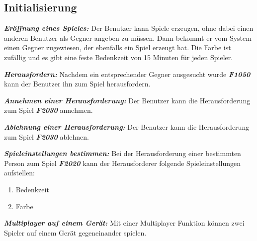 \documentclass[parskip=full]{scrartcl}
\begin{document}
	\subsection{Initialisierung}
	\begin{description}
		\hypertarget{F2010}{\item[F2010]}\textbf{\textit{Eröffnung eines Spieles: }} Der Benutzer kann Spiele erzeugen, ohne dabei einen anderen Benutzer als Gegner angeben zu müssen. Dann bekommt er vom System einen Gegner zugewiesen, der ebenfalls ein Spiel erzeugt hat. Die Farbe ist zufällig und es gibt eine feste \gls{Bedenkzeit} von 15 Minuten für jeden Spieler.
		
		\item[F2020] \textbf{\textit{Herausfordern: }} Nachdem ein entsprechender Gegner ausgesucht wurde \textbf{\textit{F1050}} kann der Benutzer ihn zum Spiel herausfordern.
		\item [F2030] \textbf{\textit{Annehmen einer Herausforderung: }} Der Benutzer kann die Herausforderung zum Spiel \textbf{\textit{F2030}} annehmen.
		\item [F2040] \textbf{\textit{Ablehnung einer Herausforderung: }} Der Benutzer kann die Herausforderung zum Spiel \textbf{\textit{F2030}} ablehnen.
		
		\item[F2050] \textbf{\textit{Spieleinstellungen bestimmen: }} Bei der Herausforderung einer bestimmten Person zum Spiel \textbf{\textit{F2020}} kann der Herausforderer folgende Spieleinstellungen aufstellen:
		\begin{enumerate}
			\item \gls{Bedenkzeit}
			\item Farbe
		\end{enumerate}
		\item[F2060] \textbf{\textit{Multiplayer auf einem Gerät: }}  Mit einer Multiplayer Funktion können zwei Spieler auf einem Gerät gegeneinander spielen.
		
		
	\end{description}
	
	
\end{document}
